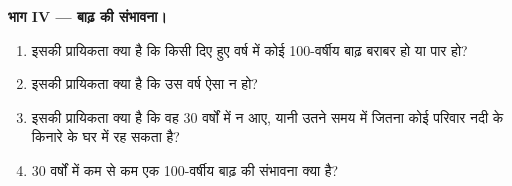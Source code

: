 \begin{problem}
\medskip
\noindent\textbf{भाग IV --- बाढ़ की संभावना।}
\begin{enumerate}[resume]
  \item इसकी प्रायिकता क्या है कि किसी दिए हुए वर्ष में कोई \num{100}-वर्षीय बाढ़ बराबर हो या
        पार हो?
  \item इसकी प्रायिकता क्या है कि उस वर्ष ऐसा न हो?
  \item इसकी प्रायिकता क्या है कि वह \num{30} वर्षों में न आए,
        यानी उतने समय में जितना कोई परिवार नदी के किनारे के घर में रह सकता है?
  \item \num{30} वर्षों में कम से कम एक \num{100}-वर्षीय बाढ़ की संभावना
        क्या है?
\end{enumerate}
\end{problem}
